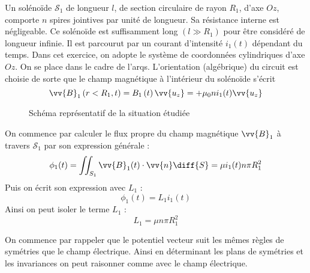 
Un solénoïde $\mathcal{S}_1$ de longueur $l$, de section circulaire de rayon $R_1$, d'axe $Oz$, comporte $n$ spires jointives par unité de longueur. Sa résistance interne est négligeable. Ce solénoïde est suffisamment long $\left( l \gg R_1 \right)$ pour être considéré de longueur infinie. Il est parcourut par un courant d'intensité $i_1 (t)$ dépendant du temps. Dans cet exercice, on adopte le système de coordonnées cylindriques d'axe $Oz$. On se place dans le cadre de l'\gls{arqs}. L'orientation (algébrique) du circuit est choisie de sorte que le champ magnétique à l'intérieur du solénoïde s'écrit
\begin{equation}
  \vv{B}_1 \left( r < R_1, t \right) = B_1 \left( t \right) \vv{u_z} = + \mu_0 n i_1 (t) \vv{u_z}
\end{equation}

\begin{figure}[H]
  \centering
  
  \caption{Schéma représentatif de la situation étudiée}
\end{figure}


On commence par calculer le flux propre du champ magnétique $\vv{B}_1$ à travers $\mathcal{S}_1$ par son expression générale :
\begin{equation}
  \phi_1 (t) = \iint_{S_1} \vv{B}_1 (t) \cdot \vv{n} \diff{S} = \mu i_1 (t) n \pi R_1^2
\end{equation}
Puis on écrit son expression avec $L_1$ :
\begin{equation}
  \phi_1 (t) = L_1 i_1 (t)
\end{equation}
Ainsi on peut isoler le terme $L_1$ :
\begin{equation}
  \boxed{L_1 = \mu n \pi R_1^2}
\end{equation}


On commence par rappeler que le potentiel vecteur suit les mêmes règles de symétries que le champ électrique. Ainsi en déterminant les plans de symétries et les invariances on peut raisonner comme avec le champ électrique.

